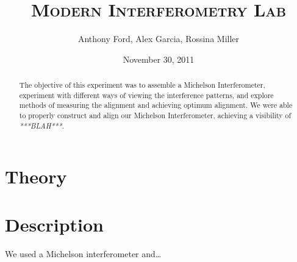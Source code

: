 \documentclass[12pt,titlepage,final]{article}
\begin{document}
\title{\textsc{Modern Interferometry Lab}}
\author{Anthony Ford, Alex Garcia, Rossina Miller}
\date{November 30, 2011}
\maketitle

\clearpage

\begin{abstract}
The objective of this experiment was to assemble a Michelson Interferometer,
experiment with different ways of viewing the interference patterns, and explore
methods of measuring the alignment and achieving optimum alignment. We were able
to properly construct and align our Michelson Interferometer, achieving a
visibility of \emph{***BLAH***}.
\end{abstract}



\section{Theory}




\section{Description}

We used a Michelson interferometer and\ldots
\end{document}
